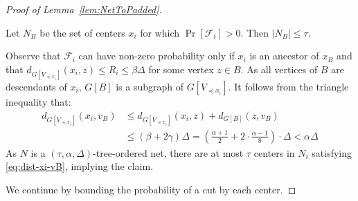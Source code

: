\documentclass{article}
\begin{document}
\begin{proof}[Proof of Lemma~\ref{lem:NetToPadded}]
	\begin{claim}\label{clm:NB-size} Let $N_B$ be the set of centers $x_i$ for which $\Pr[\mathcal{F}_i]>0$. Then $|N_B|\leq \tau$.
	\end{claim}
	\begin{subproof}
		Observe that $\mathcal{F}_i$ can have non-zero probability only if $x_i$ is an ancestor of $x_B$ and that $d_{G[V_{\preceq x_i}]}(x_{i},z) \leq R_i\leq \beta\Delta$ for some vertex $z\in B$. As  all vertices of $B$ are descendants of $x_i$,  $G[B]$ is a subgraph of $G[V_{\preceq x_i}]$. It follows from the triangle inequality that:
		\begin{align}
			d_{G[V_{\preceq x_{i}}]}(x_{i},v_{B}) & \leq d_{G[V_{\preceq x_{i}}]}(x_{i},z)+d_{G[B]}(z,v_{B})\nonumber \\
			& \leq(\beta+2\gamma)\Delta=\left(\frac{\alpha+1}{2}+2\cdot\frac{\alpha-1}{8}\right)\cdot\Delta<\alpha\Delta\label{eq:dist-xi-vB}
		\end{align}
		As $N$ is a $(\tau,\alpha,\Delta)$-tree-ordered net, there are at most $\tau$ centers in $N_i$ satisfying \cref{eq:dist-xi-vB}, implying the claim. 
	\end{subproof}	
	
	We continue by bounding the probability of a cut by each center.
	

\end{proof}
\end{document}
